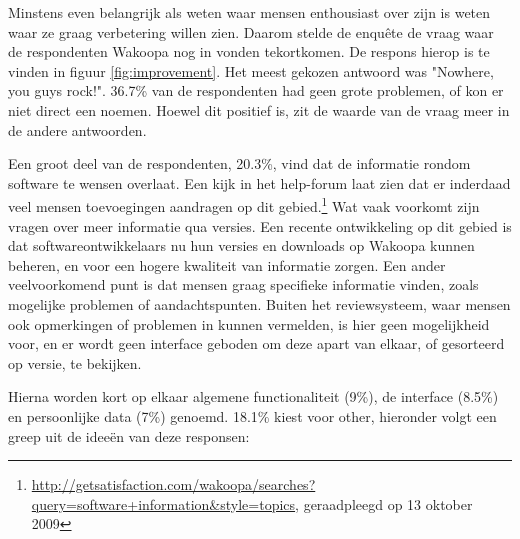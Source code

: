 \documentclass[a4paper, 10pt, pdftex]{report}
\begin{document}
      Minstens even belangrijk als weten waar mensen enthousiast over zijn is weten waar ze graag verbetering willen zien. Daarom stelde de enqu\^ete de vraag waar de respondenten Wakoopa nog in vonden tekortkomen. De respons hierop is te vinden in figuur \ref{fig:improvement}. Het meest gekozen antwoord was "Nowhere, you guys rock!". 36.7\% van de respondenten had geen grote problemen, of kon er niet direct een noemen. Hoewel dit positief is, zit de waarde van de vraag meer in de andere antwoorden.

      Een groot deel van de respondenten, 20.3\%, vind dat de informatie rondom software te wensen overlaat. Een kijk in het help-forum laat zien dat er inderdaad veel mensen toevoegingen aandragen op dit gebied.\footnote{\url{http://getsatisfaction.com/wakoopa/searches?query=software+information&style=topics}, geraadpleegd op 13 oktober 2009} Wat vaak voorkomt zijn vragen over meer informatie qua versies. Een recente ontwikkeling op dit gebied is dat softwareontwikkelaars nu hun versies en downloads op Wakoopa kunnen beheren, en voor een hogere kwaliteit van informatie zorgen. Een ander veelvoorkomend punt is dat mensen graag specifieke informatie vinden, zoals mogelijke problemen of aandachtspunten. Buiten het reviewsysteem, waar mensen ook opmerkingen of problemen in kunnen vermelden, is hier geen mogelijkheid voor, en er wordt geen interface geboden om deze apart van elkaar, of gesorteerd op versie, te bekijken.


      Hierna worden kort op elkaar algemene functionaliteit (9\%), de interface (8.5\%) en persoonlijke data (7\%) genoemd. 18.1\% kiest voor other, hieronder volgt een greep uit de idee\"en van deze responsen:
\end{document}

